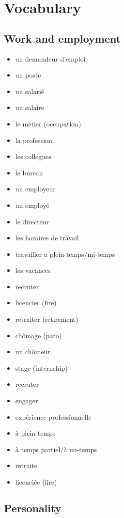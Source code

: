 \documentclass{epflnotes}
\begin{document}
\chapter{Vocabulary}

\section{Work and employment}

\begin{multicols}{3}
\begin{itemize}
\item un demandeur d'emploi
\item un poste
\item un salarié
\item un salaire
\item le métier (occupation)
\item la profession
\item les collegues
\item le bureau
\item un employeur
\item un employé
\item le directeur
\item les horaires de travail
\item travailler a plein-temps/mi-temps
\item les vacances
\item recruter
\item licencier (fire)
\item retraiter (retirement)
\item chômage (paro)
\item un chômeur
\item stage (internship)
\item recruter
\item engager
\item expérience professionnelle
\item à plein temps
\item à temps partiel/à mi-temps
\item retraite
\item licenciée (fire)
\end{itemize}
\end{multicols}

\section{Personality}
\end{document}
